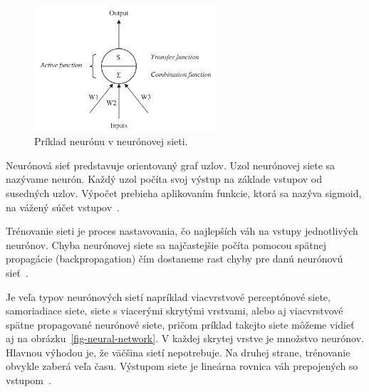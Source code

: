 \documentclass[a4paper,slovak,12pt,appendix]{article}
\begin{document}
\begin{figure}[!ht]
  \centering
  \includegraphics[width=0.6\textwidth]{neuron.png}
  \caption{Príklad neurónu v neurónovej sieti.}
  \label{fig-neuron}
\end{figure}

Neurónová sieť predstavuje orientovaný graf uzlov. Uzol neurónovej
siete sa nazývame neurón. Každý uzol počíta svoj výstup na základe vstupov od
susedných uzlov. Výpočet prebieha aplikovaním funkcie, ktorá sa nazýva sigmoid,
na vážený súčet vstupov~\cite{Gruau1994}.

Trénovanie sieti je proces nastavovania, čo najlepších váh na vstupy
jednotlivých neurónov. Chyba neurónovej siete sa najčastejšie počíta pomocou
spätnej propagácie (backpropagation) čím dostaneme rast chyby pre danú
neurónovú sieť~\cite{Tso2007}.

Je veľa typov neurónových sietí napríklad viacvrstvové perceptónové siete,
samoriadiace siete, siete s viacerými skrytými vrstvami, alebo aj viacvrstvové
spätne propagované neurónové siete, pričom príklad takejto siete môžeme vidieť
aj na obrázku~\ref{fig-neural-network}. V každej skrytej vrstve je množstvo
neurónov. Hlavnou výhodou je, že väčšina sietí nepotrebuje. Na druhej strane,
trénovanie obvykle zaberá veľa času. Výstupom siete je lineárna rovnica váh
prepojených so vstupom~\cite{KumarSingh2013}.
\end{document}
